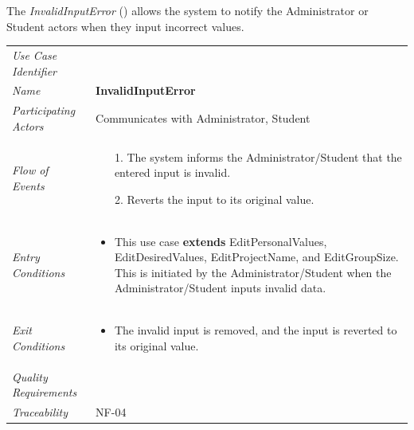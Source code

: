 \documentclass[12pt,letterpaper]{article}
\begin{document}
\newpage{}

The {\it InvalidInputError} () allows the system to notify the Administrator or Student actors when they input incorrect values.

\begin{center}
	\begin{tabu} to 
		\toprule
		Use Case Identifier &  \\
		Name & {\bf InvalidInputError} \\
		Participating Actors & Communicates with Administrator, Student \\
		Flow of Events & 
		\begin{minipage}[t]{\linewidth}
		    \begin{enumerate}
			    \item[1.] The system informs the Administrator/Student that the entered input is invalid.
			    \item[2.] Reverts the input to its original value.
		  \end{enumerate}
		\end{minipage} \\

		Entry Conditions &
		\begin{minipage}[t]{\linewidth}
			\begin{itemize}
			    \item This use case \textbf{extends} EditPersonalValues, EditDesiredValues, EditProjectName, and EditGroupSize. This is initiated by the Administrator/Student when the Administrator/Student inputs invalid data. 
	        \end{itemize}
		\end{minipage} \\

		Exit Conditions &
		\begin{minipage}[t]{\linewidth}
			\begin{itemize}
			    \item The invalid input is removed, and the input is reverted to its original value.
	        \end{itemize}
		\end{minipage} \\

		Quality Requirements & \\

		Traceability & NF-04 \\
		\toprule
	\end{tabu}
\end{center}
\end{document}
